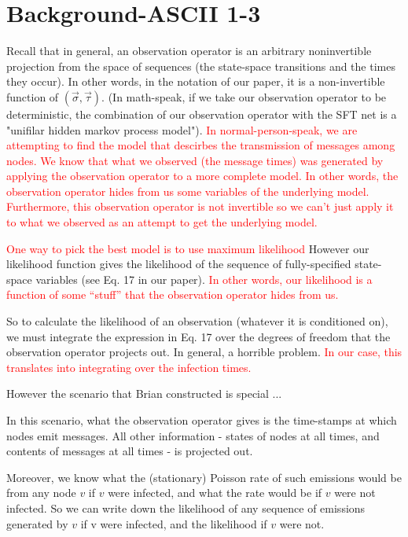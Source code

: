 \documentclass{article}
\begin{document}
\section{Background-ASCII 1-3}

	Recall that in general, an observation operator is an arbitrary
	noninvertible projection from the space of sequences (the state-space
	transitions and the times they occur). In other words, in the notation
	of our paper, it is a non-invertible function of $(\vec{\sigma},
	\vec{\tau})$. (In math-speak, if we take our observation operator to be
	deterministic, the combination of our observation operator with the
	SFT net is a "unifilar hidden markov process model").  \textcolor{red}{In
	normal-person-speak, we are attempting to find the model that descirbes
	the transmission of messages among nodes.  We know that what we
	observed (the message times) was generated  by applying the observation
	operator to a more complete model.  In other words, the observation operator
	hides from us some variables of the underlying model.  Furthermore, this
	observation operator is not invertible so we can't just apply it to what we observed
	as an attempt to get the underlying model.}

	\textcolor{red}{One way to pick the best model is to use maximum
	likelihood} However our likelihood function gives the likelihood of
	the sequence of fully-specified state-space variables (see Eq. 17
	in our paper). \textcolor{red}{In other words, our likelihood is a
	function of some ``stuff'' that the observation operator hides from us.}

	So to calculate the likelihood of an observation (whatever it is
	conditioned on), we must integrate the expression in Eq. 17 over the
	degrees of freedom that the observation operator projects out. In
	general, a horrible problem.  \textcolor{red}{In our case, this translates
	into integrating over the infection times.} 

	However the scenario that Brian constructed is special ...

	In this scenario, what the observation operator gives is the
	time-stamps at which nodes emit messages. All other information -
	states of nodes at all times, and contents of messages at all times -
	is projected out.

	Moreover, we know what the (stationary) Poisson rate of such emissions
	would be from any node $v$ if $v$ were infected, and what the rate would
	be if $v$ were not infected. So we can write down the likelihood of any
	sequence of emissions generated by $v$ if v were infected, and the
	likelihood if $v$ were not.
\end{document}
